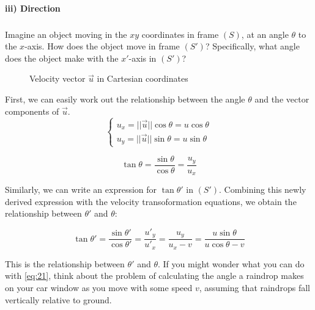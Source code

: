 \documentclass[a4paper,11pt]{article}
\numberwithin{equation}{section}
\begin{document}
 \paragraph{\indent iii) Direction}
 \subparagraph{} Imagine an object moving in the $xy$ coordinates in frame $(S)$, at an angle $\theta$ to the $x$-axis. How does the object move in frame $(S')$? Specifically, what angle does the object make with the $x'$-axis in $(S')$?
  \begin{figure}[!h] %
  \centering
    \caption{Velocity vector $\vec{u}$ in Cartesian coordinates}
    \label{fig: Velocity vector}
  \end{figure}
  
  \noindent First, we can easily work out the relationship between the angle $\theta$ and the vector components of $\vec{u}$.
  \begin{equation} \label{eq:19}
  \begin{cases} 
  u_{x}=||\vec{u}||\cos\theta=u\cos\theta\\
  u_{y}=||\vec{u}||\sin\theta=u\sin\theta 
  \end{cases}
  \end{equation}
  
  \begin{equation} \label{eq:20}
  \tan\theta=\frac{\sin\theta}{\cos\theta}=\frac{u_{y}}{u_{x}}
  \end{equation}
  
  \noindent Similarly, we can write an expression for $\tan\theta'$ in $(S')$. Combining this newly derived expression with the velocity transoformation equations, we obtain the relationship between $\theta'$ and $\theta$:
  
  \begin{equation} \label{eq:21}
  \tan\theta'=\frac{\sin\theta'}{\cos\theta'}=\frac{u'_{y}}{u'_{x}} = \frac{u_{y}}{u_{x}-v}=\frac{u\sin\theta}{u\cos\theta - v}
  \end{equation}
  
  \noindent This is the relationship between $\theta'$ and $\theta$. If you might wonder what you can do with \eqref{eq:21}, think about the problem of calculating the angle a raindrop makes on your car window as you move with some speed $v$, assuming that raindrops fall vertically relative to ground. 
 
\end{document}

